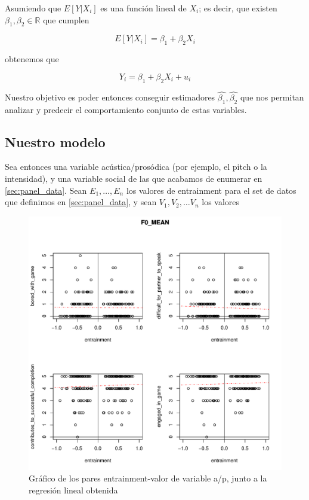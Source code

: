 Asumiendo que $E[Y|X_i]$ es una función lineal de $X_i$; es decir, que existen $\beta_1, \beta_2 \in \mathbb{R}$ que cumplen

\begin{equation}
  E[Y|X_i] = \beta_1 + \beta_2 X_i
\end{equation}

obtenemos que

\begin{equation}
  Y_i = \beta_1 + \beta_2 X_i + u_i
\end{equation}

Nuestro objetivo es poder entonces conseguir estimadores $\widehat{\beta_1}, \widehat{\beta_2}$ que nos permitan analizar y predecir el comportamiento conjunto de estas variables.

\subsection{Nuestro modelo}

Sea entonces una variable acústica/prosódica (por ejemplo, el pitch o la intensidad), y una variable social de las que acabamos de enumerar en \ref{sec:panel_data}. Sean $E_1, \ldots, E_n$ los valores de entrainment para el set de datos que definimos en \ref{sec:panel_data}, y sean $V_1, V_2, \ldots V_n$ los valores

\begin{figure}
\centering
\includegraphics[width=15cm]{images/regression_F0_MEAN_1.pdf}
\caption{Gráfico de los pares entrainment-valor de variable a/p, junto a la regresión lineal obtenida}
\end{figure}


